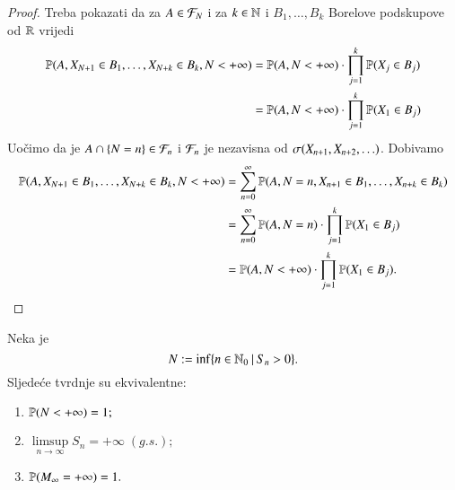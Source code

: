 \begin{proof}
    Treba pokazati da za $A \in \mathcal{F}_N$ i za $k \in \mathbb{N}$ i $B_1, \ldots, B_k$ Borelove podskupove od $\mathbb{R}$ vrijedi
    \begin{equation}    \label{jed:15.11}
        \begin{aligned}
            \mathbb{P} (A, X_{N + 1} \in B_1, \ldots, X_{N + k} \in B_k, N < +\infty) &= \mathbb{P} (A, N < +\infty) \cdot \prod\limits_{j = 1}^{k} \mathbb{P} (X_j \in B_j)\\
            &= \mathbb{P} (A, N < +\infty) \cdot \prod\limits_{j = 1}^{k} \mathbb{P} (X_1 \in B_j)
        \end{aligned}
    \end{equation}
    Uo\v cimo da je $A \cap \{ N = n \} \in \mathcal{F}_n$ i $\mathcal{F}_n$ je nezavisna od $\sigma({X_{n + 1}, X_{n + 2}, \ldots})$.
    Dobivamo
    \begin{equation*}
        \begin{aligned}
            \mathbb{P} (A, X_{N + 1} \in B_1, \ldots, X_{N + k} \in B_k, N < +\infty) &= \sum\limits_{n = 0}^{\infty} \mathbb{P} (A, N = n, X_{n + 1} \in B_1, \ldots, X_{n + k} \in B_k)\\
            &= \sum\limits_{n = 0}^{\infty} \mathbb{P} (A, N = n) \cdot \prod\limits_{j = 1}^{k} \mathbb{P} (X_1 \in B_j)\\
            &= \mathbb{P} (A, N < +\infty) \cdot \prod\limits_{j = 1}^{k} \mathbb{P} (X_1 \in B_j).
        \end{aligned}
    \end{equation*}
\end{proof}

\begin{kor} \label{kor:15.12}
    Neka je
    \begin{equation*}
        N := \inf \{{n \in \mathbb{N}_0} \: | \: {S_n > 0}\}.
    \end{equation*}
    Sljede\' ce tvrdnje su ekvivalentne:
    \begin{enumerate}[label=(\roman*)]
        \item \label{kor:15.12.1}
        $\mathbb{P} (N < + \infty) = 1;$
        \item \label{kor:15.12.2}
        $\limsup\limits_{n \to \infty} S_n = +\infty \; (g.s.);$
        \item \label{kor:15.12.3}
        $\mathbb{P} (M_\infty = +\infty) = 1.$
    \end{enumerate}
\end{kor}

